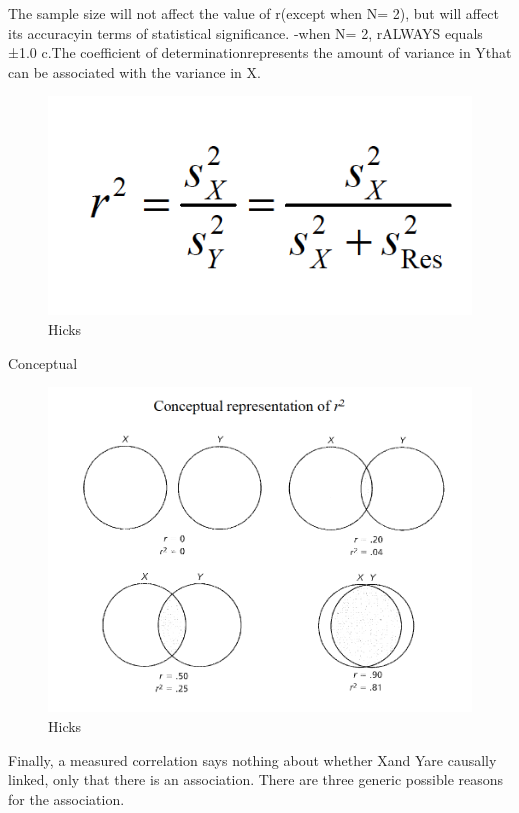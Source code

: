 \documentclass[]{book}
\theoremstyle{definition}
\theoremstyle{definition}
\theoremstyle{definition}
\theoremstyle{remark}
\begin{document}
{The sample size will not affect the value of r(except when N= 2), but
will affect its accuracyin terms of statistical significance. -when N=
2, rALWAYS equals ±1.0 c.The coefficient of determinationrepresents the
amount of variance in Ythat can be associated with the variance in X.

\begin{figure}
\centering
\includegraphics{img/hickscor12.png}
\caption{Hicks}
\end{figure}

Conceptual

\begin{figure}
\centering
\includegraphics{img/hickscor13.png}
\caption{Hicks}
\end{figure}

Finally, a measured correlation says nothing about whether Xand Yare
causally linked, only that there is an association. There are three
generic possible reasons for the association.

}
\end{document}
